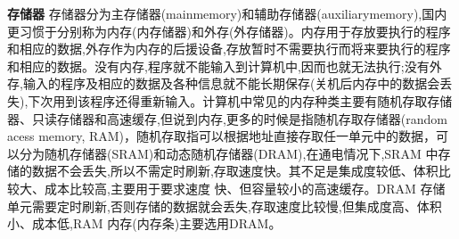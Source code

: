 \documentclass[12pt]{book}
\begin{document}
\textbf{存储器}\newline
存储器分为主存储器(mainmemory)和辅助存储器(auxiliarymemory),国内更习惯于分别称为内存(内存储器)和外存(外存储器)。内存用于存放要执行的程序和相应的数据,外存作为内存的后援设备,存放暂时不需要执行而将来要执行的程序和相应的数据。没有内存,程序就不能输入到计算机中,因而也就无法执行;没有外存,输入的程序及相应的数据及各种信息就不能长期保存(关机后内存中的数据会丢失),下次用到该程序还得重新输入。计算机中常见的内存种类主要有随机存取存储器、只读存储器和高速缓存,但说到内存,更多的时候是指随机存取存储器(random acess memory, RAM)，随机存取指可以根据地址直接存取任一单元中的数据，可以分为随机存储器(SRAM)和动态随机存储器(DRAM),在通电情况下,SRAM 中存储的数据不会丢失,所以不需定时刷新,存取速度快。其不足是集成度较低、体积比较大、成本比较高,主要用于要求速度 快、但容量较小的高速缓存。DRAM 存储单元需要定时刷新,否则存储的数据就会丢失,存取速度比较慢,但集成度高、体积小、成本低,RAM 内存(内存条)主要选用DRAM。
\end{document}
